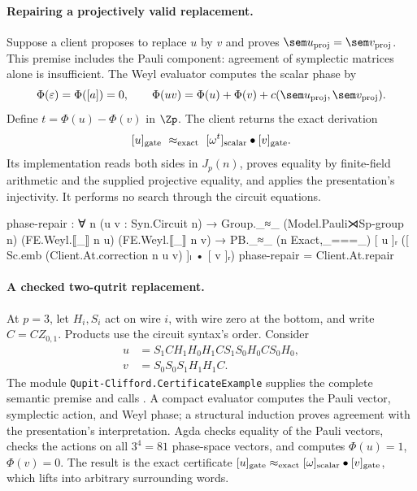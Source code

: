 \paragraph{Repairing a projectively valid replacement.}
Suppose a client proposes to replace $u$ by $v$ and proves
$\sem u_{\rm proj}=\sem v_{\rm proj}$. This premise includes the Pauli
component: agreement of symplectic matrices alone is insufficient.
The Weyl evaluator computes the scalar phase by
\[
\Phi(\varepsilon)=\Phi([a])=0,\qquad
\Phi(uv)=\Phi(u)+\Phi(v)+c(\sem u_{\rm proj},\sem v_{\rm proj}).
\]
Define $t=\Phi(u)-\Phi(v)$ in $\Zp$. The client returns the exact
derivation
\[
 [u]_{\rm gate}\ \approx_{\rm exact}\
 [\omega^t]_{\rm scalar}\bullet[v]_{\rm gate}.
\]
Its implementation reads both sides in $J_p(n)$, proves equality by
finite-field arithmetic and the supplied projective equality, and
applies the presentation's injectivity. It performs no search through
the circuit equations.

\begingroup\renewcommand{\AgdaCodeStyle}{\footnotesize}
\begin{code}
phase-repair : ∀ n (u v : Syn.Circuit n) →
  Group._≈_ (Model.Pauli⋊Sp-group n)
    (FE.Weyl.⟦_⟧ n u) (FE.Weyl.⟦_⟧ n v) →
  PB._≈_ (n Exact,_===_) [ u ]ᵣ
    ([ Sc.emb (Client.At.correction n u v) ]ₗ • [ v ]ᵣ)
phase-repair = Client.At.repair
\end{code}
\endgroup

\paragraph{A checked two-qutrit replacement.}\label{sec:client-example}
At $p=3$, let $H_i,S_i$ act on wire $i$, with wire zero at the bottom,
and write $C=CZ_{0,1}$. Products use the circuit syntax's order. Consider
\[
\begin{aligned}
u &= S_1 C H_1 H_0 H_1 C S_1 S_0 H_0 C S_0 H_0,\\
v &= S_0 S_0 S_1 H_1 H_1 C.
\end{aligned}
\]
The module \texttt{Qupit-Clifford.CertificateExample} supplies the
complete semantic premise and calls \aid{repair}. A compact evaluator
computes the Pauli vector, symplectic action, and Weyl phase; a structural
induction proves agreement with the presentation's interpretation.
Agda checks equality of the Pauli vectors, checks the actions on all
$3^4=81$ phase-space vectors, and computes
$\Phi(u)=1$, $\Phi(v)=0$. The result is the exact certificate
$[u]_{\rm gate}\approx_{\rm exact}
[\omega]_{\rm scalar}\bullet[v]_{\rm gate}$,
which  lifts into arbitrary surrounding words.


